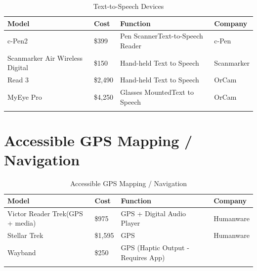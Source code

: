 \documentclass[14pt, letterpaper,twoside]{extreport}
\begin{document}
\begin{longtable}[]{@{}
    >{\raggedright\arraybackslash}p{}
    >{\raggedright\arraybackslash}p{}
    >{\raggedright\arraybackslash}p{}
    >{\raggedright\arraybackslash}p{}@{}
    }
    \toprule\noalign{}
    
    \textbf{Model}                  & \textbf{Cost} & \textbf{Function}                       & \textbf{Company} \\
    \midrule\noalign{}
    \endhead
    \bottomrule\noalign{}
    \endlastfoot
    c-Pen2                          & \$399         & Pen Scanner\break Text-to-Speech Reader & c-Pen            \\[1.0em]
    Scanmarker Air Wireless Digital & \$150         & Hand-held Text to Speech                & Scanmarker       \\[1.0em]
    Read 3                          & \$2,490       & Hand-held Text to Speech                & OrCam            \\[1.0em]
    MyEye Pro                       & \$4,250       & Glasses Mounted\break Text to Speech    & OrCam            \\[1.0em]\hline
    \caption{ Text-to-Speech Devices}
\end{longtable}


\hypertarget{accessible-gps-mapping}{%
    \pagebreak \chapter*{Accessible GPS Mapping / Navigation}\label{accessible-gps-mapping}}



\begin{longtable}[]{@{}
    >{\raggedright\arraybackslash}p{}
    >{\raggedright\arraybackslash}p{}
    >{\raggedright\arraybackslash}p{}
    >{\raggedright\arraybackslash}p{}@{}
    }
    \toprule\noalign{}
    
    \textbf{Model}                  & \textbf{Cost} & \textbf{Function}                  & \textbf{Company} \\
    \midrule\noalign{}
    \endhead
    \bottomrule\noalign{}
    \endlastfoot
    Victor Reader Trek(GPS + media) & \$975         & GPS + Digital Audio Player         & Humanware        \\[1.0em]
    Stellar Trek                    & \$1,595       & GPS                                & Humanware        \\[1.0em]
    Wayband                         & \$250         & GPS (Haptic Output - Requires App) &                  \\[1.0em]\hline
    \caption{ Accessible GPS Mapping / Navigation }
\end{longtable}
\end{document}
